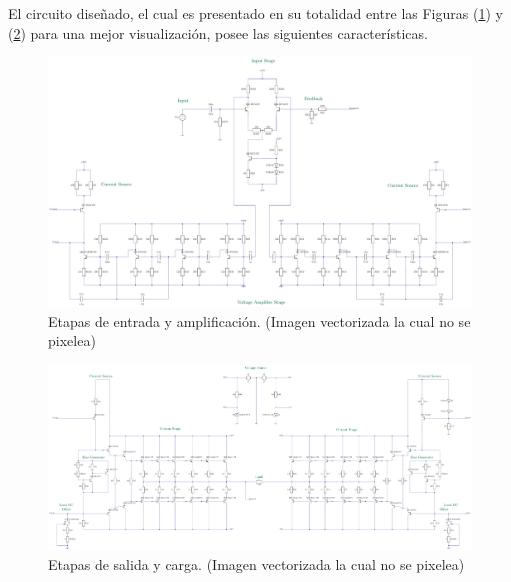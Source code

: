 
El circuito diseñado, el cual es presentado en su totalidad entre las Figuras (\ref{fig:circ}) y (\ref{fig:circ2}) para una mejor visualización, posee las siguientes características.
 \begin{figure}[H]
\centering
	\includegraphics[width=\textwidth]{ImagenesCaracteristicas/TEX1.pdf}
	\caption{Etapas de entrada y amplificación. (Imagen vectorizada la cual no se pixelea)}
	\label{fig:circ}
\end{figure}
 \begin{figure}[H]
\centering
	\includegraphics[width=\textwidth]{ImagenesCaracteristicas/TEX2.pdf}
	\caption{Etapas de salida y carga. (Imagen vectorizada la cual no se pixelea)}
	\label{fig:circ2}
\end{figure}

